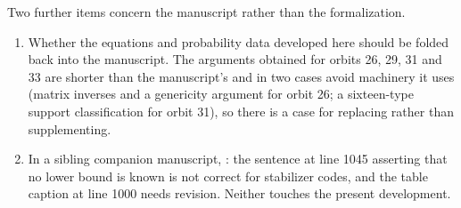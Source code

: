 \documentclass[11pt,a4paper]{article}
\theoremstyle{definition}
\begin{document}
Two further items concern the manuscript rather than the formalization.

\begin{enumerate}
\item Whether the equations and probability data developed here should be folded
  back into the manuscript. The arguments obtained for orbits 26, 29, 31 and 33
  are shorter than the manuscript's and in two cases avoid machinery it uses
  (matrix inverses and a genericity argument for orbit 26; a sixteen-type support
  classification for orbit 31), so there is a case for replacing rather than
  supplementing.
\item In a sibling companion manuscript, : the
  sentence at line 1045 asserting that no lower bound is known is not correct for
  stabilizer codes, and the table caption at line 1000 needs revision. Neither
  touches the present development.
\end{enumerate}
\end{document}
